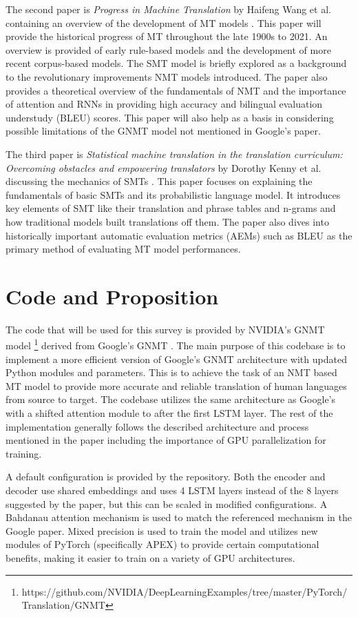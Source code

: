 \documentclass{article}
\begin{document}
The second paper is \textit{Progress in Machine Translation} by Haifeng Wang et al. containing an overview of the development of MT models \cite{WANG2022143}. This paper will provide the historical progress of MT throughout the late 1900s to 2021. An overview is provided of early rule-based models and the development of more recent corpus-based models. The SMT model is briefly explored as a background to the revolutionary improvements NMT models introduced. The paper also provides a theoretical overview of the fundamentals of NMT and the importance of attention and RNNs in providing high accuracy and bilingual evaluation understudy (BLEU) scores. This paper will also help as a basis in considering possible limitations of the GNMT model not mentioned in Google's paper.

The third paper is \textit{Statistical machine translation in the translation curriculum: Overcoming obstacles and empowering translators} by Dorothy Kenny et al. discussing the mechanics of SMTs \cite{SMTTCurriculum}. This paper focuses on explaining the fundamentals of basic SMTs and its probabilistic language model. It introduces key elements of SMT like their translation and phrase tables and n-grams and how traditional models built translations off them. The paper also dives into historically important automatic evaluation metrics (AEMs) such as BLEU as the primary method of evaluating MT model performances. 

\section{Code and Proposition}
The code that will be used for this survey is provided by NVIDIA's GNMT model \footnote{https://github.com/NVIDIA/DeepLearningExamples/tree/master/PyTorch/Translation/GNMT} derived from Google's GNMT \cite{github} . The main purpose of this codebase is to implement a more efficient version of Google's GNMT architecture with updated Python modules and parameters. This is to achieve the task of an NMT based MT model to provide more accurate and reliable translation of human languages from source to target. The codebase utilizes the same architecture as Google's with a shifted attention module to after the first LSTM layer. The rest of the implementation generally follows the described architecture and process mentioned in the paper including the importance of GPU parallelization for training. \cite{github}

A default configuration is provided by the repository. Both the encoder and decoder use shared embeddings and uses 4 LSTM layers instead of the 8 layers suggested by the paper, but this can be scaled in modified configurations. A Bahdanau attention mechanism is used to match the referenced mechanism in the Google paper. Mixed precision is used to train the model and utilizes new modules of PyTorch (specifically APEX) to provide certain computational benefits, making it easier to train on a variety of GPU architectures. \cite{github}
\end{document}
